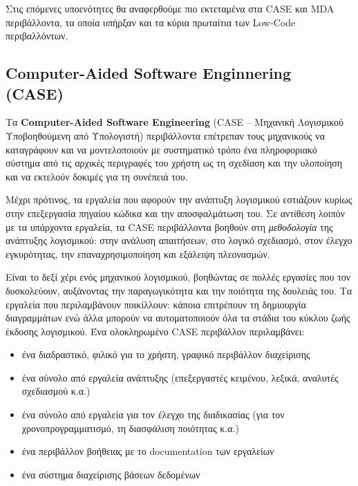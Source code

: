         Στις επόμενες υποενότητες θα αναφερθούμε πιο εκτεταμένα στα CASE και MDA περιβάλλοντα, τα οποία υπήρξαν και τα κύρια πρωταίτια των Low-Code περιβαλλόντων.

        \subsection{Computer-Aided Software Enginnering (CASE)}
            Τα \textbf{Computer-Aided Software Engineering} (CASE -- Μηχανική Λογισμικού Υποβοηθούμενη από Υπολογιστή) περιβάλλοντα επέτρεπαν τους μηχανικούς να καταγράφουν και να μοντελοποιούν με συστηματικό τρόπο ένα πληροφοριακό σύστημα από τις αρχικές περιγραφές του χρήστη ως τη σχεδίαση και την υλοποίηση και να εκτελούν δοκιμές για τη συνέπειά του.

            Μέχρι πρότινος, τα εργαλεία που αφορούν την ανάπτυξη λογισμικού εστιάζουν κυρίως στην επεξεργασία πηγαίου κώδικα και την αποσφαλμάτωση του. Σε αντίθεση λοιπόν με τα υπάρχοντα εργαλεία, τα CASE περιβάλλοντα βοηθούν στη \textit{μεθοδολογία} της ανάπτυξης λογισμικού: στην ανάλυση απαιτήσεων, στο λογικό σχεδιασμό, στον έλεγχο εγκυρότητας, την επαναχρησιμοποίηση και εξάλειψη πλεονασμών.

            Είναι το δεξί χέρι ενός μηχανικού λογισμικού, βοηθώντας σε πολλές εργασίες που τον δυσκολεύουν, αυξάνοντας την παραγωγικότητα και την ποιότητα της δουλειάς του. Τα εργαλεία που περιλαμβάνουν ποικίλλουν: κάποια επιτρέπουν τη δημιουργία διαγραμμάτων ενώ άλλα μπορούν να αυτοματοποιούν όλα τα στάδια του κύκλου ζωής έκδοσης λογισμικού. Ένα ολοκληρωμένο CASE περιβάλλον περιλαμβάνει:
            \vspace{-0.5em}
            \begin{itemize}[label={\tiny \blacksquare}]
                \setlength\itemsep{-0.25em}
                \item ένα διαδραστικό, φιλικό για το χρήστη, γραφικό περιβάλλον διαχείρισης
                \item ένα σύνολο από εργαλεία ανάπτυξης (επεξεργαστές κειμένου, λεξικά, αναλυτές σχεδιασμού κ.α.)
                \item ένα σύνολο από εργαλεία για τον έλεγχο της διαδικασίας (για τον χρονοπρογραμματισμό, τη διασφάλιση ποιότητας κ.α.)
                \item ένα περιβάλλον βοήθειας με το documentation των εργαλείων
                \item ένα σύστημα διαχείρισης βάσεων δεδομένων
            \end{itemize}
            \vspace{-0.5em}

